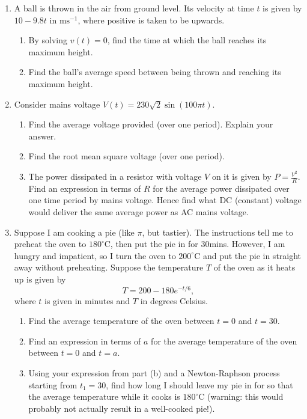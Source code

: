 \documentclass{article}
\begin{document}
\begin{enumerate}
	\item A ball is thrown in the air from ground level. Its velocity at time $t$ is given by $10-9.8t$ in $\mathrm{ms}^{-1}$, where positive is taken to be upwards.
		\begin{enumerate}
			\item By solving $v(t)=0$, find the time at which the ball reaches its maximum height.
			\item Find the ball's average speed between being thrown and reaching its maximum height.
		\end{enumerate}
	\item Consider mains voltage $V(t)=230\sqrt{2}\sin(100\pi t)$.
		\begin{enumerate}
			\item Find the average voltage provided (over one period). Explain your answer.
			\item Find the root mean square voltage (over one period).
			\item The power dissipated in a resistor with voltage $V$ on it is given by $P=\frac{V^2}{R}$. Find an expression in terms of $R$ for the average power dissipated over one time period by mains voltage. Hence find what DC (constant) voltage would deliver the same average power as AC mains voltage.
		\end{enumerate}
	\item Suppose I am cooking a pie (like $\pi$, but tastier). The instructions tell me to preheat the oven to $180^\circ \mathrm{C}$, then put the pie in for 30mins. However, I am hungry and impatient, so I turn the oven to $200^\circ \mathrm{C}$ and put the pie in straight away without preheating. Suppose the temperature $T$ of the oven as it heats up is given by
		\[T=200-180e^{- t/6},\]
		where $t$ is given in minutes and $T$ in degrees Celsius.
		\begin{enumerate}
			\item Find the average temperature of the oven between $t=0$ and $t=30$.
			\item Find an expression in terms of $a$ for the average temperature of the oven between $t=0$ and $t=a$.
			\item Using your expression from part (b) and a Newton-Raphson process starting from $t_1=30$, find how long I should leave my pie in for so that the average temperature while it cooks is $180^\circ \mathrm{C}$ (warning: this would probably not actually result in a well-cooked pie!).
		\end{enumerate}
\end{enumerate}
\end{document}
